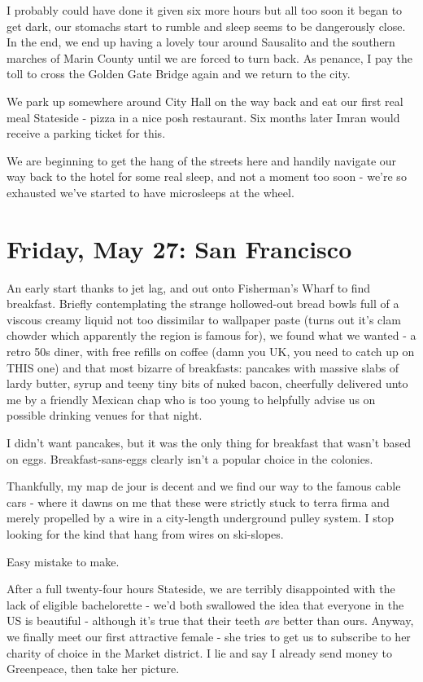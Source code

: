 \documentclass[a5paper,titlepage,11pt]{book}
\begin{document}
I probably could have done it given six more hours but all too soon it began to get dark, our stomachs start to rumble and sleep seems to be dangerously close.  In the end, we end up having a lovely tour around Sausalito and the southern marches of Marin County until we are forced to turn back.  As penance, I pay the toll to cross the Golden Gate Bridge again and we return to the city.

We park up somewhere around City Hall on the way back and eat our first real meal Stateside - pizza in a nice posh restaurant.  Six months later Imran would receive a parking ticket for this.

We are beginning to get the hang of the streets here and handily navigate our way back to the hotel for some real sleep, and not a moment too soon - we're so exhausted we've started to have microsleeps at the wheel.

\chapter[San Francisco]{Friday, May 27: San Francisco}
An early start thanks to jet lag, and out onto Fisherman's Wharf to find breakfast.  Briefly contemplating the strange hollowed-out bread bowls full of a viscous creamy liquid not too dissimilar to wallpaper paste (turns out it's clam chowder which apparently the region is famous for), we found what we wanted - a retro 50s diner, with free refills on coffee (damn you UK, you need to catch up on THIS one) and that most bizarre of breakfasts: pancakes with massive slabs of lardy butter, syrup and teeny tiny bits of nuked bacon, cheerfully delivered unto me by a friendly Mexican chap who is too young to helpfully advise us on possible drinking venues for that night.

I didn't want pancakes, but it was the only thing for breakfast that wasn't based on eggs.  Breakfast-sans-eggs clearly isn't a popular choice in the colonies.

Thankfully, my map de jour is decent and we find our way to the famous cable cars - where it dawns on me that these were strictly stuck to terra firma and merely propelled by a wire in a city-length underground pulley system.  I stop looking for the kind that hang from wires on ski-slopes.

Easy mistake to make.

After a full twenty-four hours Stateside, we are terribly disappointed with the lack of eligible bachelorette - we'd both swallowed the idea that everyone in the US is beautiful - although it's true that their teeth \emph{are} better than ours.  Anyway, we finally meet our first attractive female - she tries to get us to subscribe to her charity of choice in the Market district.  I lie and say I already send money to Greenpeace, then take her picture.
\end{document}
